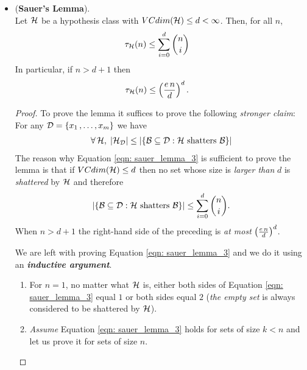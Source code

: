 \documentclass[11pt]{article}
\begin{document}
\begin{itemize}
\item \begin{lemma} (\textbf{Sauer's Lemma}). \citep{shalev2014understanding, mohri2018foundations}\\
Let ${\mathcal H}$ be a hypothesis class with $VCdim({\mathcal H}) \le d < \infty$. Then, for all $n$, 
\begin{align}
\tau_{{\mathcal H}}(n) &\le \sum_{i=0}^{d}{{n}\choose{i}} \label{eqn: sauer_lemma_1}
\end{align}
In particular, if $n > d + 1$ then
\begin{align}
\tau_{{\mathcal H}}(n) &\le \left(\frac{e\,n}{d}\right)^{d}. \label{eqn: sauer_lemma_2}
\end{align}
\end{lemma}
\begin{proof}
To prove the lemma it suffices to prove the following \emph{stronger claim}: For any ${\mathcal D} = \left\{x_1 \,{,}\ldots{,}\, x_m\right\}$ we have
\begin{align}
\forall\, {\mathcal H}, \; \left\lvert {\mathcal H}_{{\mathcal D}} \right\rvert \le  \left\lvert \left\{{\mathcal B} \subseteq {\mathcal D}: {\mathcal H}\text{ shatters }{\mathcal B}\right\} \right\rvert\label{eqn: sauer_lemma_3}
\end{align} The reason why Equation \eqref{eqn: sauer_lemma_3} is sufficient to prove the lemma is that if
$VCdim({\mathcal H}) \le d$ then no set whose size is \emph{larger than} $d$ is \emph{shattered} by ${\mathcal H}$ and therefore
\begin{align*}
\left\lvert \left\{{\mathcal B} \subseteq {\mathcal D}: {\mathcal H}\text{ shatters }{\mathcal B}\right\} \right\rvert \le  \sum_{i=0}^{d}{{n}\choose{i}}.
\end{align*}
When $n > d + 1$ the right-hand side of the preceding is \emph{at most} $\left(\frac{e\,n}{d}\right)^{d}$.

We are left with proving Equation \eqref{eqn: sauer_lemma_3} and we do it using an \emph{\textbf{inductive argument}}. 
\begin{enumerate}
\item For $n = 1$, no matter what ${\mathcal H}$ is, either both sides of Equation \eqref{eqn: sauer_lemma_3} equal $1$ or both sides equal $2$ (\emph{the empty set} is always considered to be shattered by ${\mathcal H}$).

\item  \emph{Assume} Equation \eqref{eqn: sauer_lemma_3} holds for sets of size $k < n$ and let us prove it for sets of size $n$. 


\end{enumerate}
\end{proof}
\end{itemize}
\end{document}
